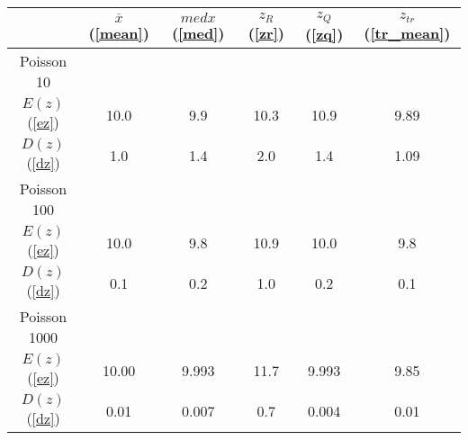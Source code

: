 \begin{tabular}{|c|c|c|c|c|c|}
\hline
 & $\overline{x}$ (\ref{mean}) & $med x$ (\ref{med}) & $z_R$ (\ref{zr}) & $z_Q$ (\ref{zq}) & $z_{tr}$ (\ref{tr_mean})\\
\hline
Poisson 10 &  &  &  &  & \\
\hline
$E(z)$ (\ref{ez}) & 10.0 & 9.9 & 10.3 & 10.9 & 9.89\\
\hline
$D(z)$ (\ref{dz}) & 1.0 & 1.4 & 2.0 & 1.4 & 1.09\\
\hline
Poisson 100 &  &  &  &  & \\
\hline
$E(z)$ (\ref{ez}) & 10.0 & 9.8 & 10.9 & 10.0 & 9.8\\
\hline
$D(z)$ (\ref{dz}) & 0.1 & 0.2 & 1.0 & 0.2 & 0.1\\
\hline
Poisson 1000 &  &  &  &  & \\
\hline
$E(z)$ (\ref{ez}) & 10.00 & 9.993 & 11.7 & 9.993 & 9.85\\
\hline
$D(z)$ (\ref{dz}) & 0.01 & 0.007 & 0.7 & 0.004 & 0.01\\
\hline
\end{tabular}

